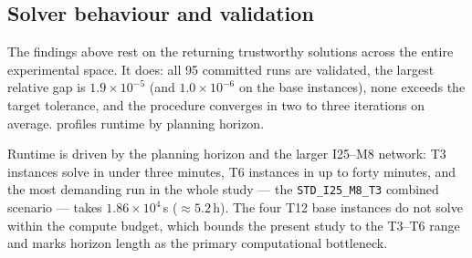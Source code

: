 \subsection{Solver behaviour and validation}
\label{sec:exp:scalability}

The findings above rest on the \DBP returning trustworthy solutions across the
entire experimental space. It does: all 95 committed runs are validated, the
largest relative gap is $1.9\times10^{-5}$ (and $1.0\times10^{-6}$ on the base
instances), none exceeds the target tolerance, and the procedure converges in
two to three iterations on average.  profiles runtime by
planning horizon.

\begin{table}[ht]
  \centering
  \caption{Runtime profile of the validated base runs.}
  \label{tab:comparison}
  
\end{table}

Runtime is driven by the planning horizon and the larger I25--M8 network: T3
instances solve in under three minutes, T6 instances in up to forty minutes,
and the most demanding run in the whole study --- the \texttt{STD\_I25\_M8\_T3}
combined scenario --- takes $1.86\times10^{4}$\,s ($\approx5.2$\,h). The four
T12 base instances do not solve within the compute budget, which bounds the
present study to the T3--T6 range and marks horizon length as the primary
computational bottleneck.
